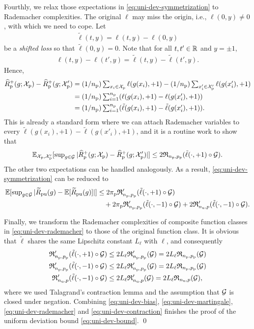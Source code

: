 Fourthly, we relax those expectations in \eqref{eq:uni-dev-symmetrization} to Rademacher complexities. The original $\ell$ may miss the origin, i.e., $\ell(0,y)\neq0$, with which we need to cope. Let
\begin{align*}
\tilde{\ell}(t,y)=\ell(t,y)-\ell(0,y)
\end{align*}
be a \emph{shifted loss} so that $\tilde{\ell}(0,y)=0$. Note that for all $t,t'\in\mathbb{R}$ and $y=\pm1$, 
\begin{align*}
\ell(t,y)-\ell(t',y)=\tilde{\ell}(t,y)-\tilde{\ell}(t',y).
\end{align*}
Hence,
\begin{align*}
\widehat{R}_\mathrm{p}^+(g;\mathcal{X}_\mathrm{p})-\widehat{R}_\mathrm{p}^+(g;\mathcal{X}_\mathrm{p}')
&\textstyle = (1/{n_\mathrm{p}})\sum_{x_i\in\mathcal{X}_\mathrm{p}}\ell(g(x_i),+1)
-(1/{n_\mathrm{p}})\sum_{x'_i\in\mathcal{X}_\mathrm{p}'}\ell(g(x'_i),+1)\\
&\textstyle = (1/{n_\mathrm{p}})\sum_{i=1}^{n_\mathrm{p}}(\ell(g(x_i),+1)-\ell(g(x'_i),+1))\\
&\textstyle = (1/{n_\mathrm{p}})\sum_{i=1}^{n_\mathrm{p}}
(\tilde{\ell}(g(x_i),+1)-\tilde{\ell}(g(x'_i),+1)).
\end{align*}
This is already a standard form where we can attach Rademacher variables to every $\tilde{\ell}(g(x_i),+1)-\tilde{\ell}(g(x'_i),+1)$, and it is a routine work to show that
\begin{align*}
\mathbb{E}_{\mathcal{X}_\mathrm{p},\mathcal{X}_\mathrm{p}'}[\sup\nolimits_{g\in\mathcal{G}}|\widehat{R}_\mathrm{p}^+(g;\mathcal{X}_\mathrm{p})-\widehat{R}_\mathrm{p}^+(g;\mathcal{X}_\mathrm{p}')|]
\le 2\mathfrak{R}_{{n_\mathrm{p}},p_\mathrm{p}}(\tilde{\ell}(\cdot,+1)\circ\mathcal{G}).
\end{align*}
The other two expectations can be handled analogously. As a result, \eqref{eq:uni-dev-symmetrization} can be reduced to
\begin{align}
\bE[\sup\nolimits_{g\in\cG}|\tRpu(g)-\bE[\tRpu(g)]|]
&\le 2\pip\fR'_{\Np,\prp}(\tilde{\ell}(\cdot,+1)\circ\cG) \notag\\
\label{eq:uni-dev-rademacher}%
&\quad +2\pip\fR'_{\Np,\prp}(\tilde{\ell}(\cdot,-1)\circ\cG)
+2\fR'_{\Nu,p}(\tilde{\ell}(\cdot,-1)\circ\cG).
\end{align}

Finally, we transform the Rademacher complexities of composite function classes in \eqref{eq:uni-dev-rademacher} to those of the original function class. It is obvious that $\tilde{\ell}$ shares the same Lipschitz constant $L_\ell$ with $\ell$, and consequently
\begin{align}
\fR'_{\Np,\prp}(\tilde{\ell}(\cdot,+1)\circ\cG)
&\le 2L_\ell\fR'_{\Np,\prp}(\cG)
= 2L_\ell\fR_{\Np,\prp}(\cG) \notag\\
\label{eq:uni-dev-contraction}%
\fR'_{\Np,\prp}(\tilde{\ell}(\cdot,-1)\circ\cG)
&\le 2L_\ell\fR'_{\Np,\prp}(\cG)
= 2L_\ell\fR_{\Np,\prp}(\cG)\\
\fR'_{\Nu,p}(\tilde{\ell}(\cdot,-1)\circ\cG)
&\le 2L_\ell\fR'_{\Nu,p}(\cG)
= 2L_\ell\fR_{\Nu,p}(\cG), \notag
\end{align}
where we used Talagrand's contraction lemma and the assumption that $\mathcal{G}$ is closed under negation. Combining \eqref{eq:uni-dev-bias}, \eqref{eq:uni-dev-martingale}, \eqref{eq:uni-dev-rademacher} and \eqref{eq:uni-dev-contraction} finishes the proof of the uniform deviation bound \eqref{eq:uni-dev-bound}. \qed

